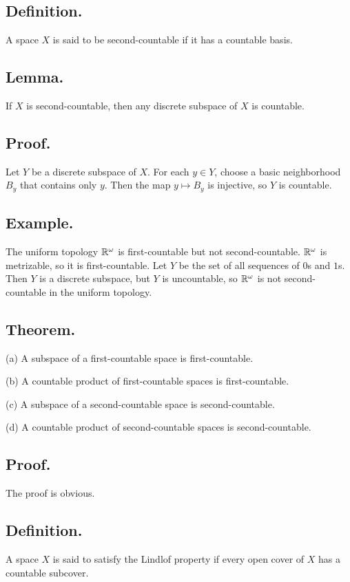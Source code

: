 \documentclass[titlepage]{article}
\begin{document}
\subsection{Definition.} A space $X$ is said to be second-countable if it has a countable basis.

\subsection{Lemma.} If $X$ is second-countable, then any discrete subspace of $X$ is countable.

\subsection{Proof.} Let $Y$ be a discrete subspace of $X$. For each $y \in Y$, choose a basic neighborhood $B_{y}$ that contains only $y$. Then the map $y \mapsto B_{y}$ is injective, so $Y$ is countable.

\subsection{Example.} The uniform topology $\mathbb{R}^{\omega}$ is first-countable but not second-countable. $\mathbb{R}^{\omega}$ is metrizable, so it is first-countable. Let $Y$ be the set of all sequences of $0$s and $1$s. Then $Y$ is a discrete subspace, but $Y$ is uncountable, so $\mathbb{R}^{\omega}$ is not second-countable in the uniform topology.

\subsection{Theorem.} 

(a) A subspace of a first-countable space is first-countable.

(b) A countable product of first-countable spaces is first-countable.

(c) A subspace of a second-countable space is second-countable.

(d) A countable product of second-countable spaces is second-countable.

\subsection{Proof.} The proof is obvious.

\subsection{Definition.} A space $X$ is said to satisfy the Lindlof property if every open cover of $X$ has a countable subcover.
\end{document}
